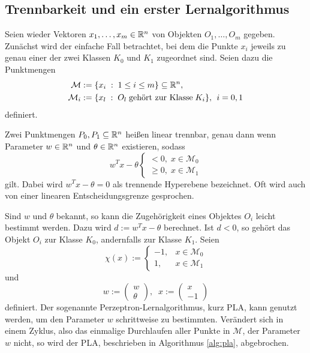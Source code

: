 \subsection{Trennbarkeit und ein erster Lernalgorithmus}
\label{abs:trenn}
Seien wieder Vektoren $x_1, \ldots, x_m \in \mathbb{R}^{n}$ von Objekten $O_1, \ldots, O_m$ gegeben. Zunächst wird der einfache Fall betrachtet, bei dem die Punkte $x_i$ jeweils zu genau einer der zwei Klassen $K_0$ und $K_{1}$ zugeordnet sind. Seien dazu die Punktmengen
\begin{align*}
    \mathcal{M} & :=\{x_i \; : \; 1 \leq i \leq m\} \subseteq \mathbb{R}^{n}, \\
    \mathcal{M}_i &:=\{x_l \; : \; O_l \; \text{gehört zur Klasse} \; K_i\}, \; \, i=0,1
\end{align*}
definiert.

\begin{defi}
    Zwei Punktmengen $P_0, P_{1} \subseteq \mathbb{R}^n$ heißen linear trennbar, genau dann wenn Parameter $w \in \mathbb{R}^n$ und $\theta \in \mathbb{R}^n$ existieren, sodass
    \begin{equation*}
        w^T x - \theta \begin{cases}
            <0, \; x \in \mathcal{M}_{0} \\
            \geq 0, \; x \in \mathcal{M}_1
        \end{cases}
    \end{equation*}
    gilt. Dabei wird $w^T x- \theta=0$ als trennende Hyperebene bezeichnet. Oft wird auch von einer linearen Entscheidungsgrenze gesprochen.
\end{defi}
Sind $w$ und $\theta$ bekannt, so kann die Zugehörigkeit eines Objektes $O_i$ leicht bestimmt werden. Dazu wird $d:=w^T x -\theta$ berechnet. Ist $d<0$, so gehört das Objekt $O_i$ zur Klasse $K_0$, andernfalls zur Klasse $K_1$. Seien 
\begin{equation*}
    \chi(x):= \begin{cases}
        -1,  &x \in \mathcal{M}_0 \\
        1,  &x \in \mathcal{M}_1
    \end{cases}
\end{equation*}
und \begin{equation*}
    w:= \begin{pmatrix}
    w \\
    \theta    
    \end{pmatrix}, \; \; x:=\begin{pmatrix}
        x \\
        -1
    \end{pmatrix} 
\end{equation*}
definiert.
Der sogenannte Perzeptron-Lernalgorithmus\cite{rosenblatt1958perceptron}, kurz PLA, kann genutzt werden, um den Parameter $w$ schrittweise zu bestimmten. Verändert sich in einem Zyklus, also das einmalige Durchlaufen aller Punkte in $\mathcal{M}$, der Parameter $w$ nicht, so wird der PLA, beschrieben in Algorithmus \ref{alg:pla}, abgebrochen.


